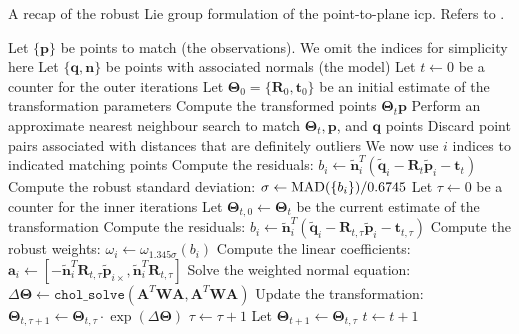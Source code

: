 \begin{algorithm}
\caption{A recap of the robust Lie group formulation of the point-to-plane \gls{icp}. Refers to .}\label{c1:alg:liep2plan}
\begin{algorithmic}
\State Let $\{\mathbf{p}\}$ be points to match (the observations). We omit the indices for simplicity here
\State Let $\{\mathbf{q},\mathbf{n}\}$ be points with associated normals (the model)
\State Let $t \gets 0$ be a counter for the outer iterations
\State Let $\mathbf{\Theta}_0 = \{\mathbf{R}_0,\mathbf{t}_0\}$ be an initial estimate of the transformation parameters
  \State Compute the transformed points $\mathbf{\Theta}_t \mathbf{p}$
  \State Perform an approximate nearest neighbour search to match $\mathbf{\Theta}_t, \mathbf{p}$, and $\mathbf{q}$ points
  \State Discard point pairs associated with distances that are definitely outliers
  \State We now use $i$ indices to indicated matching points
  \State Compute the residuals: $b_i \gets \tilde{\mathbf{n}}_i^T (\tilde{\mathbf{q}}_i - \mathbf{R}_t \tilde{\mathbf{p}}_i - \mathbf{t}_t)$
  \State {}
  \State Compute the robust standard deviation: $\sigma \gets \operatorname{MAD}(\{b_i\})/0.6745$
  \State {}
  \State Let $\tau \gets 0$ be a counter for the inner iterations
  \State Let $\mathbf{\Theta}_{t,0} \gets \mathbf{\Theta}_{t}$ be the current estimate of the transformation
      \State Compute the residuals: $b_i \gets \tilde{\mathbf{n}}_i^T (\tilde{\mathbf{q}}_i - \mathbf{R}_{t,\tau} \tilde{\mathbf{p}}_i - \mathbf{t}_{t,\tau})$
    \EndIf
    \State Compute the robust weights: $\omega_i \gets \omega_{1.345\sigma}(b_i)$
    \State Compute the linear coefficients: $\mathbf{a}_i \gets [-\tilde{\mathbf{n}}_i^T \mathbf{R}_{t,\tau} {{\tilde{\mathbf{p}}}_{i\times}}, \tilde{\mathbf{n}}_i^T \mathbf{R}_{t,\tau}]$
    \State Solve the weighted normal equation:
    \State \quad $\Delta\mathbf{\Theta} \gets \texttt{chol\_solve}(\mathbf{A}^T \mathbf{W} \mathbf{A}, \mathbf{A}^T \mathbf{W} \mathbf{A})$
    \State Update the transformation: $\mathbf{\Theta}_{t,\tau+1} \gets \mathbf{\Theta}_{t,\tau} \cdot \exp(\Delta\mathbf{\Theta})$
    \State $\tau \gets \tau+1$
  \EndWhile
  \State Let $\mathbf{\Theta}_{t+1} \gets \mathbf{\Theta}_{t,\tau}$
  \State $t \gets t+1$
\EndWhile
\end{algorithmic}
\end{algorithm}